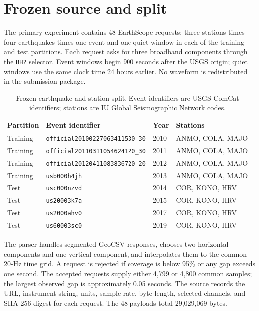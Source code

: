 \documentclass[11pt]{article}
\begin{document}
\section{Frozen source and split}

The primary experiment contains 48 EarthScope requests: three stations times
four earthquakes times one event and one quiet window in each of the
training and test partitions.  Each request asks for three broadband
components through the \texttt{BH?} selector.  Event windows begin 900 seconds
after the USGS origin; quiet windows use the same clock time 24 hours earlier.
No waveform is redistributed in the submission package.

\begin{table}[h]
\caption{Frozen earthquake and station split.  Event identifiers are USGS
ComCat identifiers; stations are IU Global Seismographic Network codes.}
\centering
\small
\begin{tabularx}{\textwidth}{lllX}
\toprule
Partition & Event identifier & Year & Stations \\
\midrule
Training & \texttt{official20100227063411530\_30} & 2010 & ANMO, COLA, MAJO\\
Training & \texttt{official20110311054624120\_30} & 2011 & ANMO, COLA, MAJO\\
Training & \texttt{official20120411083836720\_20} & 2012 & ANMO, COLA, MAJO\\
Training & \texttt{usb000h4jh} & 2013 & ANMO, COLA, MAJO\\
Test & \texttt{usc000nzvd} & 2014 & COR, KONO, HRV\\
Test & \texttt{us20003k7a} & 2015 & COR, KONO, HRV\\
Test & \texttt{us2000ahv0} & 2017 & COR, KONO, HRV\\
Test & \texttt{us60003sc0} & 2019 & COR, KONO, HRV\\
\bottomrule
\end{tabularx}
\end{table}

The parser handles segmented GeoCSV responses, chooses two horizontal
components and one vertical component, and interpolates them to the common
20-Hz time grid.  A request is rejected if coverage is below 95\% or any gap
exceeds one second.  The accepted requests supply either 4,799 or 4,800
common samples; the largest observed gap is approximately 0.05 seconds.  The source
records the URL, instrument string, units, sample rate, byte length, selected
channels, and SHA-256 digest for each request.  The 48 payloads total
29,029,069 bytes.
\end{document}
